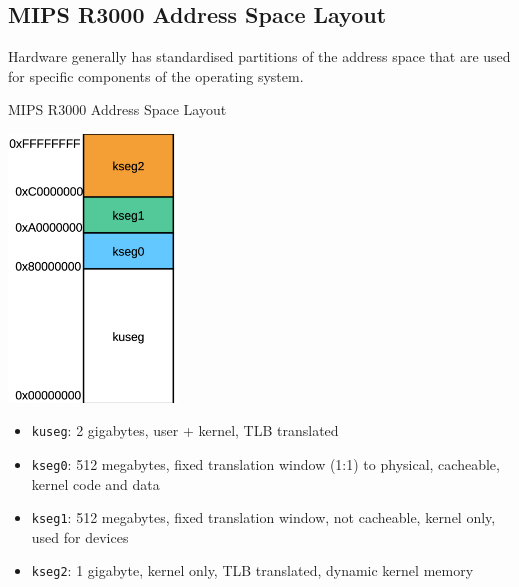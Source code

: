 \documentclass[journal, letterpaper]{IEEEtran}
\begin{document}
\subsection{MIPS R3000 Address Space Layout}
Hardware generally has standardised partitions of the address space that are used for specific components of the operating system.
\begin{theory}{MIPS R3000 Address Space Layout} 
    \begin{center}
        \includegraphics[width=4.5cm]{./photos/r3000_addr.png}
    \end{center}
    \begin{itemize}
        \item \verb|kuseg|: 2 gigabytes, user + kernel, TLB translated
        \item \verb|kseg0|: 512 megabytes, fixed translation window (1:1) to physical, cacheable, kernel code and data
        \item \verb|kseg1|: 512 megabytes, fixed translation window, not cacheable, kernel only, used for devices
        \item \verb|kseg2|: 1 gigabyte, kernel only, TLB translated, dynamic kernel memory
    \end{itemize}
\end{theory}
\end{document}

